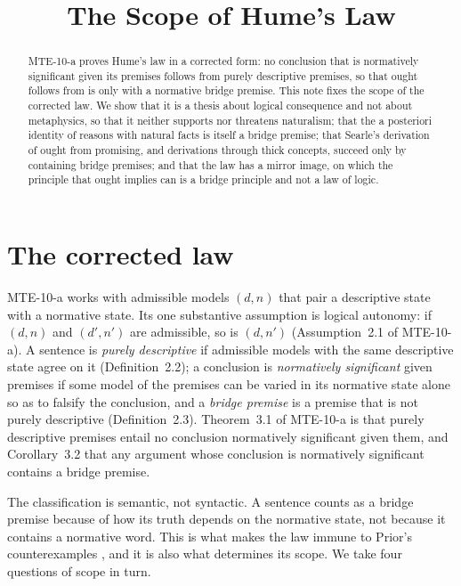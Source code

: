 \documentclass{situationist-preprint}
\title{The Scope of Hume's Law}
\begin{document}
\maketitle

\begin{abstract}
MTE-10-a proves Hume's law in a corrected form: no conclusion that is normatively significant given its premises follows from purely descriptive premises, so that ought follows from is only with a normative bridge premise. This note fixes the scope of the corrected law. We show that it is a thesis about logical consequence and not about metaphysics, so that it neither supports nor threatens naturalism; that the a posteriori identity of reasons with natural facts is itself a bridge premise; that Searle's derivation of ought from promising, and derivations through thick concepts, succeed only by containing bridge premises; and that the law has a mirror image, on which the principle that ought implies can is a bridge principle and not a law of logic.
\end{abstract}

\section{The corrected law}

MTE-10-a works with admissible models $(d,n)$ that pair a descriptive state with a normative state. Its one substantive assumption is logical autonomy: if $(d,n)$ and $(d',n')$ are admissible, so is $(d,n')$ (Assumption~2.1 of MTE-10-a). A sentence is \emph{purely descriptive} if admissible models with the same descriptive state agree on it (Definition~2.2); a conclusion is \emph{normatively significant} given premises if some model of the premises can be varied in its normative state alone so as to falsify the conclusion, and a \emph{bridge premise} is a premise that is not purely descriptive (Definition~2.3). Theorem~3.1 of MTE-10-a is that purely descriptive premises entail no conclusion normatively significant given them, and Corollary~3.2 that any argument whose conclusion is normatively significant contains a bridge premise.

The classification is semantic, not syntactic. A sentence counts as a bridge premise because of how its truth depends on the normative state, not because it contains a normative word. This is what makes the law immune to Prior's counterexamples \citep{Prior1960}, and it is also what determines its scope. We take four questions of scope in turn.
\end{document}
